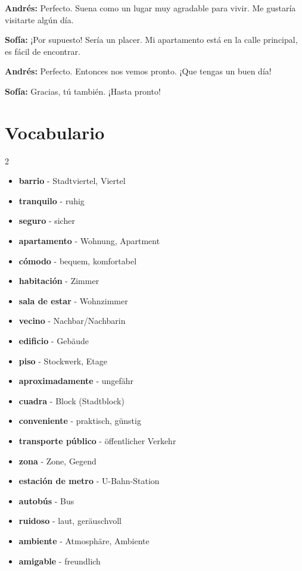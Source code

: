 \documentclass[12pt,a4paper]{article}
\begin{document}
\textbf{Andrés:} Perfecto. Suena como un lugar muy agradable para vivir. Me gustaría visitarte algún día.

\textbf{Sofía:} ¡Por supuesto! Sería un placer. Mi apartamento está en la calle principal, es fácil de encontrar.

\textbf{Andrés:} Perfecto. Entonces nos vemos pronto. ¡Que tengas un buen día!

\textbf{Sofía:} Gracias, tú también. ¡Hasta pronto!

\newpage

\section*{Vocabulario}

\begin{multicols}{2}
\begin{itemize}[leftmargin=*]
    \item \textbf{barrio} - Stadtviertel, Viertel
    \item \textbf{tranquilo} - ruhig
    \item \textbf{seguro} - sicher
    \item \textbf{apartamento} - Wohnung, Apartment
    \item \textbf{cómodo} - bequem, komfortabel
    \item \textbf{habitación} - Zimmer
    \item \textbf{sala de estar} - Wohnzimmer
    \item \textbf{vecino} - Nachbar/Nachbarin
    \item \textbf{edificio} - Gebäude
    \item \textbf{piso} - Stockwerk, Etage
    \item \textbf{aproximadamente} - ungefähr
    \item \textbf{cuadra} - Block (Stadtblock)
    \item \textbf{conveniente} - praktisch, günstig
    \item \textbf{transporte público} - öffentlicher Verkehr
    \item \textbf{zona} - Zone, Gegend
    \item \textbf{estación de metro} - U-Bahn-Station
    \item \textbf{autobús} - Bus
    \item \textbf{ruidoso} - laut, geräuschvoll
    \item \textbf{ambiente} - Atmosphäre, Ambiente
    \item \textbf{amigable} - freundlich

\end{itemize}
\end{multicols}
\end{document}
